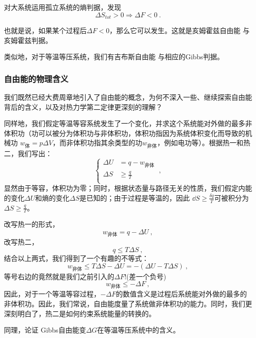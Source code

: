 对大系统运用孤立系统的熵判据，发现
\begin{equation}
\Delta S_{tot} > 0\Rightarrow \Delta F < 0~.
\end{equation}

也就是说，如果某个过程后$\Delta F < 0$，那么它可以发生。这就是亥姆霍兹自由能 与 亥姆霍兹判据。

类似地，对于等温等压系统，我们有吉布斯自由能 与相应的Gibbs判据。

\subsubsection{自由能的物理含义}
我们既然已经大费周章地引入了自由能的概念，为何不深入一些、继续探索自由能背后的含义，以及对热力学第二定律更深刻的理解？

同样地，我们假定等温等容系统发生了一个变化，并求这个系统能对外做的最多非体积功（功可以被分为体积功与非体积功，体积功指因为系统体积变化而导致的机械功  $w_\text{体}=p\Delta V$，而非体积功指其余类型的功$w_\text{非体}$，例如电功等）。根据热一和热二，我们写出：
\begin{equation}
\left \{
    \begin{aligned}
    \Delta U &= q-w_\text{非体}\\
    \Delta S &\ge \frac{q}{T}\\
    \end{aligned}
\right.~,
\end{equation}
显然由于等容，体积功为零；同时，根据状态量与路径无关的性质，我们假定内能的变化$\Delta U$和熵的变化$\Delta S$是已知的；由于过程是等温的，因此 $\dd S \ge \frac{\delta q}{T}$可被积分为 $\Delta S \ge \frac{q}{T}$。

改写热一的形式，
$$
w_\text{非体} = q - \Delta U
~,
$$
改写热二，
$$
q \le T\Delta S
~,
$$
结合以上两式，我们得到了一个有趣的不等式：
$$
w_\text{非体} \le T \Delta S - \Delta U = - (\Delta U-T \Delta S ) ~,
$$
等号右边的竟然就是我们之前引入的$\Delta F$!(差一个负号) 
\begin{equation}
w_\text{非体} \le - \Delta F~,
\end{equation}
因此，对于一个等温等容过程，$-\Delta F$的数值含义是过程后系统能对外做的最多的非体积功。因此，我们常说，自由能度量了系统做非体积功的能力。同时，我们更深刻明白了，热二是如何约束系统能量的转换的。

\begin{exercise}{}
同理，论证 Gibbs自由能变$\Delta G$在等温等压系统中的含义。
\end{exercise}

